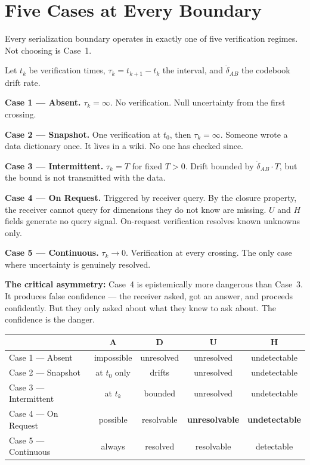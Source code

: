 \documentclass[11pt,a4paper]{article}
\begin{document}
\section{Five Cases at Every Boundary}
\label{sec:five-cases}

Every serialization boundary operates in exactly one of five 
verification regimes. Not choosing is Case~1.

Let $t_k$ be verification times, $\tau_k = t_{k+1} - t_k$ the 
interval, and $\dot{\delta}_{AB}$ the codebook drift rate.

\textbf{Case 1 --- Absent.} $\tau_k = \infty$. No verification. 
Null uncertainty from the first crossing.

\textbf{Case 2 --- Snapshot.} One verification at $t_0$, then 
$\tau_k = \infty$. Someone wrote a data dictionary once. It lives 
in a wiki. No one has checked since.

\textbf{Case 3 --- Intermittent.} $\tau_k = T$ for fixed $T > 0$. 
Drift bounded by $\dot{\delta}_{AB} \cdot T$, but the bound is not 
transmitted with the data.

\textbf{Case 4 --- On Request.} Triggered by receiver query. By the 
closure property, the receiver cannot query for dimensions they do 
not know are missing. $U$ and $H$ fields generate no query signal. 
On-request verification resolves known unknowns only.

\textbf{Case 5 --- Continuous.} $\tau_k \to 0$. Verification at 
every crossing. The only case where uncertainty is genuinely resolved.

\textbf{The critical asymmetry:} Case~4 is epistemically more 
dangerous than Case~3. It produces false confidence --- the receiver 
asked, got an answer, and proceeds confidently. But they only asked 
about what they knew to ask about. The confidence is the danger.

\begin{center}\small
\begin{tabular}{@{}lcccc@{}}
\toprule
& \textbf{A} & \textbf{D} & \textbf{U} & \textbf{H} \\
\midrule
Case 1 --- Absent      & impossible & unresolved 
& unresolved & undetectable \\
Case 2 --- Snapshot    & at $t_0$ only & drifts 
& unresolved & undetectable \\
Case 3 --- Intermittent & at $t_k$ & bounded 
& unresolved & undetectable \\
Case 4 --- On Request  & possible & resolvable 
& \textbf{unresolvable} & \textbf{undetectable} \\
Case 5 --- Continuous  & always & resolved 
& resolvable & detectable \\
\bottomrule
\end{tabular}
\end{center}
\end{document}
